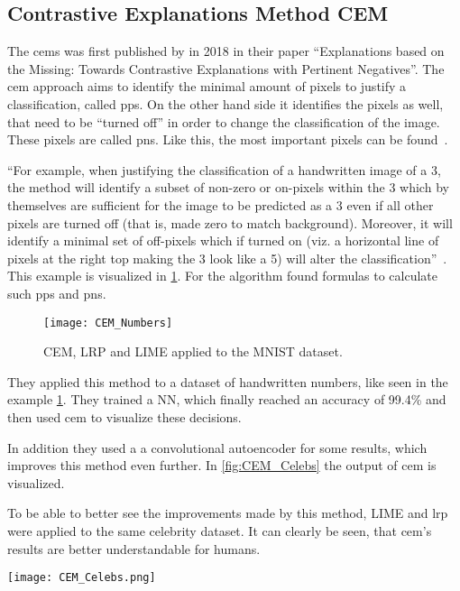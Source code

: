 \subsection{Contrastive Explanations Method CEM}
The \glspl{cem} was first published by  in 2018 in their paper “Explanations based on the Missing: Towards Contrastive Explanations with Pertinent Negatives”.
The \gls{cem} approach aims to identify the minimal amount of pixels to justify a classification, called \glspl{pp}. On the other hand side it identifies the pixels as well, that need to be “turned off” in order to change the classification of the image. These pixels are called \glspl{pn}. Like this, the most important pixels can be found~\cite{Luss.}.
\par
“For example, when justifying the classification of a handwritten image of a 3, the method will identify a subset of non-zero or on-pixels within the 3 which by themselves are sufficient for the image to be predicted as a 3 even if all other pixels are turned off (that is, made zero to match background). Moreover, it will identify a minimal set of off-pixels which if turned on (viz. a horizontal line of pixels at the right top making the 3 look like a 5) will alter the classification”~\cite[2]{Luss.}.
This example is visualized in \cref{fig:CEM_Numbers}. For the algorithm  found formulas to calculate such \glspl{pp} and \glspl{pn}.
\begin{figure}
    \center{}
    \texttt{[image: CEM\_Numbers]}
    \caption{CEM, LRP and LIME applied to the MNIST dataset.~\cite{Dhurandhar.2018}}\label{fig:CEM_Numbers}
\end{figure}
They applied this method to a dataset of handwritten numbers, like seen in the example \cref{fig:CEM_Numbers}. They trained a NN, which finally reached an accuracy of 99.4\% and then used \gls{cem} to visualize these decisions. 
\par 
In addition they used a a convolutional autoencoder for some results, which improves this method even further. In \cref{fig:CEM_Celebs} the output of \gls{cem} is visualized. 
\par
To be able to better see the improvements made by this method, LIME and \gls{lrp} were applied to the same celebrity dataset. It can clearly be seen, that \gls{cem}'s results are better understandable for humans.
\begin{figure*}[ht]
    \center{}
    \texttt{[image: CEM\_Celebs.png]}
    \caption{CEM and LIME applied to a celebrity dataset~\cite{Luss.}}\label{fig:CEM_Celebs}
\end{figure*}


